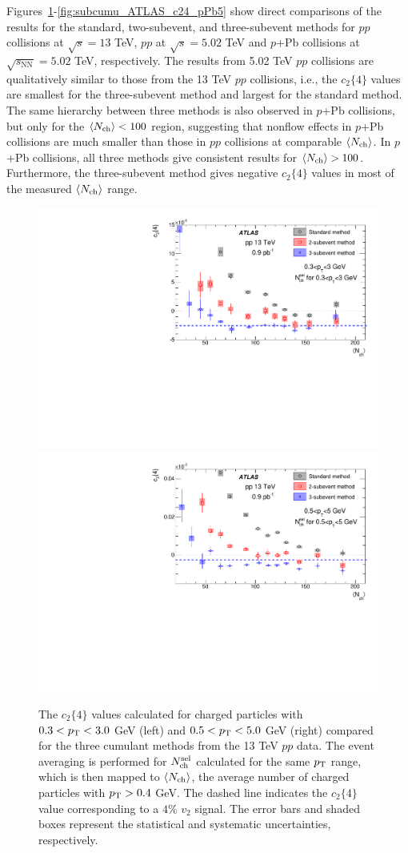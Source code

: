 Figures~\ref{fig:subcumu_ATLAS_c24_pp13}-\ref{fig:subcumu_ATLAS_c24_pPb5} show direct comparisons of the results for the standard, two-subevent, and three-subevent methods for $pp$ collisions at $\sqrt{s}=13$ TeV, $pp$ at $\sqrt{s}=5.02$ TeV and $p$+Pb collisions at $\sqrt{s_\text{NN}}=5.02$ TeV, respectively. The results from 5.02 TeV $pp$ collisions are qualitatively similar to those from the 13 TeV $pp$ collisions, i.e., the $c_2\{4\}$ values are smallest for the three-subevent method and largest for the standard method. The same hierarchy between three methods is also observed in $p$+Pb collisions, but only for the $\left\langle N_\text{ch}\right\rangle<100$ region, suggesting that nonflow effects in $p$+Pb collisions are much smaller than those in $pp$ collisions at comparable $\left\langle N_\text{ch}\right\rangle$. In $p$+Pb collisions, all three methods give consistent results for $\left\langle N_\text{ch}\right\rangle>100$. Furthermore, the three-subevent method gives negative $c_2\{4\}$ values in most of the measured $\left\langle N_\text{ch}\right\rangle$ range.

\begin{figure}[H]
\centering
\includegraphics[width=.475\linewidth]{figs/chapter_subcumu/ATLAS_c24_pp13_pT0}
\includegraphics[width=.475\linewidth]{figs/chapter_subcumu/ATLAS_c24_pp13_pT1}
\caption{The $c_2\{4\}$ values calculated for charged particles with $0.3<p_\text{T}<3.0$ GeV (left) and $0.5<p_\text{T}<5.0$ GeV (right) compared for the three cumulant methods from the 13 TeV $pp$ data. The event averaging is performed for $N_\text{ch}^\text{sel}$ calculated for the same $p_\text{T}$ range, which is then mapped to $\left\langle N_\text{ch}\right\rangle$, the average number of charged particles with $p_\text{T}>0.4$ GeV. The dashed line indicates the $c_2\{4\}$ value corresponding to a $4\%$ $v_2$ signal. The error bars and shaded boxes represent the statistical and systematic uncertainties, respectively.}
\label{fig:subcumu_ATLAS_c24_pp13}
\end{figure}

